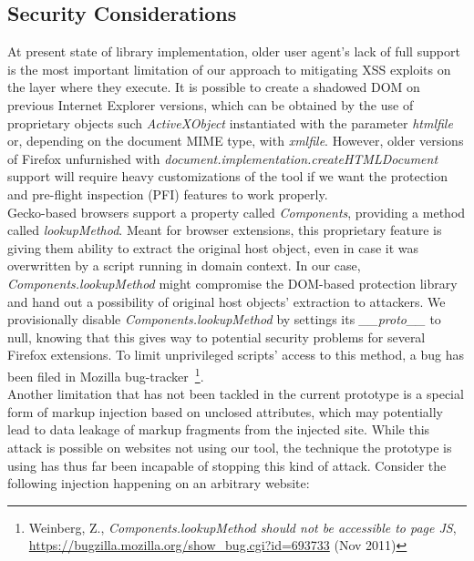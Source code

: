     \subsection{Security Considerations}
    \label{subsubsec:6.6.9.security_considerations}

      At present state of library implementation, older user agent's lack of full support is the most important limitation of our approach to mitigating XSS exploits on the layer where they execute. It is possible to create a shadowed DOM on previous Internet Explorer versions, which can be obtained by the use of proprietary objects such \textit{ActiveXObject} instantiated with the parameter \textit{htmlfile} or, depending on the document MIME type, with \textit{xmlfile}. However, older versions of Firefox unfurnished with \textit{document.implementation.createHTMLDocument} support will require heavy customizations of the tool if we want the protection and pre-flight inspection (PFI) features to work properly. \\

      Gecko-based browsers support a property called \emph{Components}, providing a method called \textit{lookupMethod}. Meant for browser extensions, this proprietary feature is giving them ability to extract the original host object, even in case it was overwritten by a script running in domain context. In our case, \textit{Components.lookupMethod} might compromise the DOM-based protection library and hand out a possibility of original host objects' extraction to attackers. We provisionally disable \textit{Components.lookupMethod} by settings its \textit{\_\_proto\_\_} to null, knowing that this gives way to potential security problems for several Firefox extensions. To limit unprivileged scripts' access to this method, a bug has been filed in Mozilla bug-tracker~\footnote{Weinberg, Z., \textit{Components.lookupMethod should not be accessible to page JS}, \url{https://bugzilla.mozilla.org/show_bug.cgi?id=693733} (Nov 2011)}. \\

      Another limitation that has not been tackled in the current prototype is a special form of markup injection based on unclosed attributes, which may potentially lead to data leakage of markup fragments from the injected site. While this attack is possible on websites not using our tool, the technique the prototype is using has thus far been incapable of stopping this kind of attack. Consider the following injection happening on an arbitrary website: 


